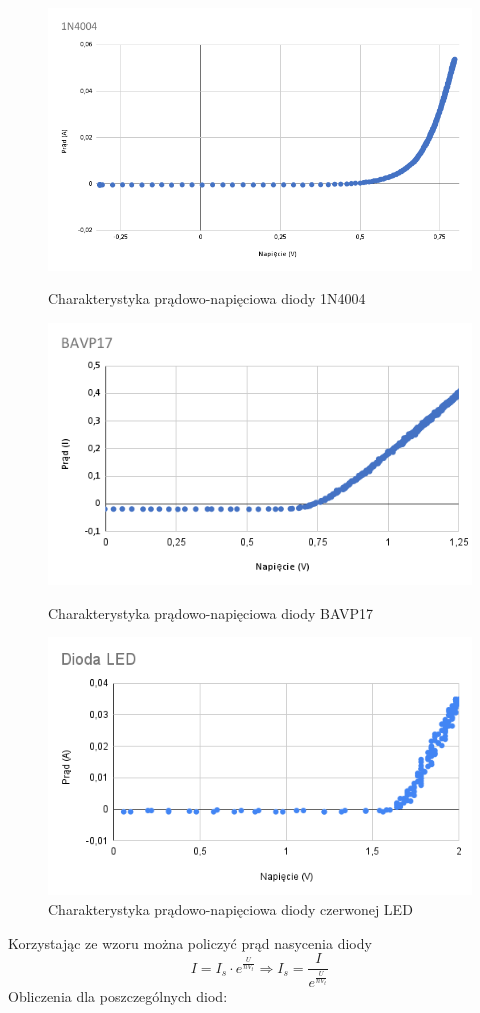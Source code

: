 \documentclass{article}
\begin{document}
\begin{figure}[h!]
  \includegraphics[scale=0.3]{./img/1N4004.png}
  \caption{Charakterystyka prądowo-napięciowa diody 1N4004}
  \includegraphics[scale=0.4]{./img/BAVP17.png}
  \caption{Charakterystyka prądowo-napięciowa diody BAVP17}
  \includegraphics[scale=0.4]{./img/LED.png}
  \caption{Charakterystyka prądowo-napięciowa diody czerwonej LED}
\end{figure}
\clearpage
Korzystając ze wzoru można policzyć prąd nasycenia diody\[
  I = I_s \cdot e^{\frac{U}{nV_t}} \Rightarrow
  I_s = \frac{I}{e^{\frac{U}{nV_t}}} 
\]
Obliczenia dla poszczególnych diod: \\
\end{document}

